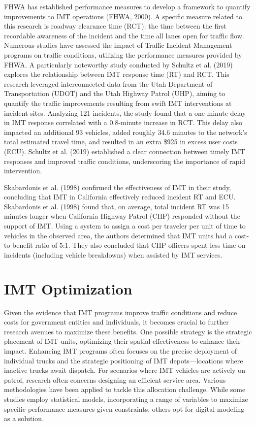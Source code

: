 \documentclass[fancy, oneside, mastersfancy, ms]{byuthesis}
\begin{document}
FHWA has established performance measures to develop a framework to
quantify improvements to IMT operations (FHWA, 2000). A specific measure
related to this research is roadway clearance time (RCT): the time
between the first recordable awareness of the incident and the time all
lanes open for traffic flow. Numerous studies have assessed the impact
of Traffic Incident Management programs on traffic conditions, utilizing
the performance measures provided by FHWA. A particularly noteworthy
study conducted by Schultz et al. (2019) explores the relationship
between IMT response time (RT) and RCT. This research leveraged
interconnected data from the Utah Department of Transportation (UDOT)
and the Utah Highway Patrol (UHP), aiming to quantify the traffic
improvements resulting from swift IMT interventions at incident sites.
Analyzing 121 incidents, the study found that a one-minute delay in IMT
response correlated with a 0.8-minute increase in RCT. This delay also
impacted an additional 93 vehicles, added roughly 34.6 minutes to the
network's total estimated travel time, and resulted in an extra \$925 in
excess user costs (ECU). Schultz et al. (2019) established a clear
connection between timely IMT responses and improved traffic conditions,
underscoring the importance of rapid intervention.

Skabardonis et al. (1998) confirmed the effectiveness of IMT in their
study, concluding that IMT in California effectively reduced incident RT
and ECU. Skabardonis et al. (1998) found that, on average, total
incident RT was 15 minutes longer when California Highway Patrol (CHP)
responded without the support of IMT. Using a system to assign a cost
per traveler per unit of time to vehicles in the observed area, the
authors determined that IMT units had a cost-to-benefit ratio of 5:1.
They also concluded that CHP officers spent less time on incidents
(including vehicle breakdowns) when assisted by IMT services.

\hypertarget{sec-lit_imt_opt}{%
\section{IMT Optimization}\label{sec-lit_imt_opt}}

Given the evidence that IMT programs improve traffic conditions and
reduce costs for government entities and individuals, it becomes crucial
to further research avenues to maximize these benefits. One possible
strategy is the strategic placement of IMT units, optimizing their
spatial effectiveness to enhance their impact. Enhancing IMT programs
often focuses on the precise deployment of individual trucks and the
strategic positioning of IMT depots---locations where inactive trucks
await dispatch. For scenarios where IMT vehicles are actively on patrol,
research often concerns designing an efficient service area. Various
methodologies have been applied to tackle this allocation challenge.
While some studies employ statistical models, incorporating a range of
variables to maximize specific performance measures given constraints,
others opt for digital modeling as a solution.
\end{document}
